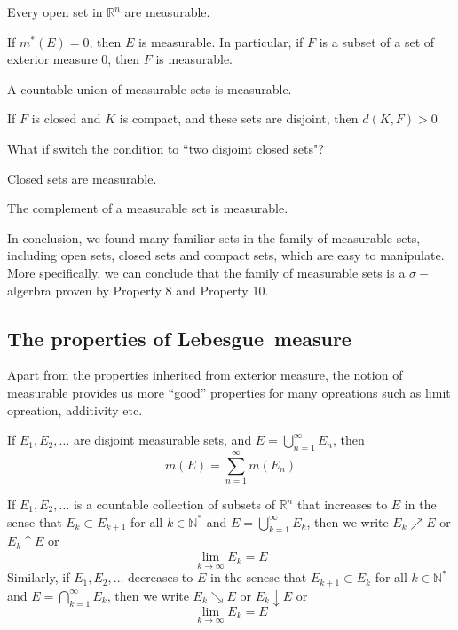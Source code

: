 \documentclass{ctexbook}
\begin{document}
\begin{prop}
    Every open set in $\mathbb{R}^n$ are measurable.
\end{prop}
\begin{prop}
    If $m^*(E)=0$, then $E$ is measurable. In particular, if $F$ is a subset of a set of exterior measure 0, then $F$ is measurable.
\end{prop}
\begin{prop}
    A countable union of measurable sets is measurable.
\end{prop}
\begin{lema}
    If $F$ is closed and $K$ is compact, and these sets are disjoint, then $d(K,F)>0$
\end{lema}
\noindent What if switch the condition to ``two disjoint closed sets"?
\begin{prop}
    Closed sets are measurable.
\end{prop}
\begin{prop}
    The complement of a measurable set is measurable.
\end{prop}
In conclusion, we found many familiar sets in the family of measurable sets, including open sets, closed sets and compact sets,
which are easy to manipulate. More specifically, we can conclude that the family of measurable sets is a $\sigma-$algerbra proven
by Property 8 and Property 10.

\subsection*{The properties of Lebesgue~measure}

Apart from the properties inherited from exterior measure, the notion of measurable provides us more ``good'' properties
for many opreations such as limit opreation, additivity etc. 

\begin{thm}
    If $E_1,E_2,\ldots$ are disjoint measurable sets, and $E = \bigcup\limits_{n=1}^{\infty}E_n$, then
    \[m(E)=\sum\limits_{n=1}^{\infty}m(E_n)\]
\end{thm}

\begin{define}
    If $E_1,E_2,\ldots$ is a countable collection of subsets of $\mathbb{R}^n$ that increases to $E$ in the sense that
    $E_k \subset E_{k+1}$ for all $k \in \mathbb{N}^*$ and $E = \bigcup\limits_{k=1}^\infty E_k$, then we write 
    $E_k \nearrow E$ or $E_k \uparrow E$ or \[\lim \limits_{k\rightarrow \infty}E_k = E\]
    Similarly, if $E_1,E_2,\ldots$ decreases to $E$ in the senese that $E_{k+1} \subset E_k$ for all $k \in \mathbb{N}^*$
    and $E = \bigcap\limits_{k=1}^{\infty}E_k$, then we write 
    $E_k \searrow E$ or $E_k \downarrow E$ or \[\lim \limits_{k\rightarrow \infty}E_k = E\]
\end{define}
\end{document}
